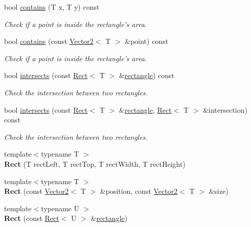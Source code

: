 \begin{DoxyCompactItemize}
bool \hyperlink{classsf_1_1_rect_aa8a5364c84de6dd5299f833b54e31ef1}{contains} (T x, T y) const 
\begin{DoxyCompactList}\small\item\em Check if a point is inside the rectangle's area. \end{DoxyCompactList}\item 
bool \hyperlink{classsf_1_1_rect_a24163acdb9b2987c0ea55c201e270d41}{contains} (const \hyperlink{classsf_1_1_vector2}{Vector2}$<$ T $>$ \&point) const 
\begin{DoxyCompactList}\small\item\em Check if a point is inside the rectangle's area. \end{DoxyCompactList}\item 
bool \hyperlink{classsf_1_1_rect_a566740c8f58e01bb052266f47e7e1011}{intersects} (const \hyperlink{classsf_1_1_rect}{Rect}$<$ T $>$ \&\hyperlink{structrectangle}{rectangle}) const 
\begin{DoxyCompactList}\small\item\em Check the intersection between two rectangles. \end{DoxyCompactList}\item 
bool \hyperlink{classsf_1_1_rect_a5f1874792b04c7e221bb786b31f5836e}{intersects} (const \hyperlink{classsf_1_1_rect}{Rect}$<$ T $>$ \&\hyperlink{structrectangle}{rectangle}, \hyperlink{classsf_1_1_rect}{Rect}$<$ T $>$ \&intersection) const 
\begin{DoxyCompactList}\small\item\em Check the intersection between two rectangles. \end{DoxyCompactList}\item 
\hypertarget{classsf_1_1_rect_a53956cee21c818a3355429e3662fe384}{{\footnotesize template$<$typename T $>$ }\\{\bfseries Rect} (T rect\+Left, T rect\+Top, T rect\+Width, T rect\+Height)}\label{classsf_1_1_rect_a53956cee21c818a3355429e3662fe384}

\item 
\hypertarget{classsf_1_1_rect_a7e0ea3f83003ac89b11fd45d581059cc}{{\footnotesize template$<$typename T $>$ }\\{\bfseries Rect} (const \hyperlink{classsf_1_1_vector2}{Vector2}$<$ T $>$ \&position, const \hyperlink{classsf_1_1_vector2}{Vector2}$<$ T $>$ \&size)}\label{classsf_1_1_rect_a7e0ea3f83003ac89b11fd45d581059cc}

\item 
\hypertarget{classsf_1_1_rect_a6fff2bb7e93677839461a66bc2957de0}{{\footnotesize template$<$typename U $>$ }\\{\bfseries Rect} (const \hyperlink{classsf_1_1_rect}{Rect}$<$ U $>$ \&\hyperlink{structrectangle}{rectangle})}\label{classsf_1_1_rect_a6fff2bb7e93677839461a66bc2957de0}

\end{DoxyCompactItemize}
